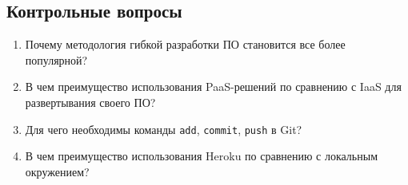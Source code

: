 \subsection{Контрольные вопросы}
\begin{enumerate}
    \item Почему методология гибкой разработки ПО становится все более популярной?
    \item В чем преимущество использования PaaS-решений по сравнению с IaaS для развертывания своего ПО?
    \item Для чего необходимы команды \texttt{add}, \texttt{commit}, \texttt{push} в Git?
    \item В чем преимущество использования Heroku по сравнению с локальным окружением?
\end{enumerate}

\clearpage
